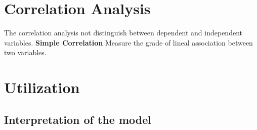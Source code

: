 \documentclass[10pt,landscape]{article}
\begin{document}
\begin{multicols}{3}
\section*{Correlation Analysis}
The correlation analysis not distinguish between dependent and independent variables.
\textbf{Simple Correlation}
Measure the grade of lineal association between two variables.

\section*{Utilization}

\subsection*{Interpretation of the model}



\end{multicols}
\end{document}
